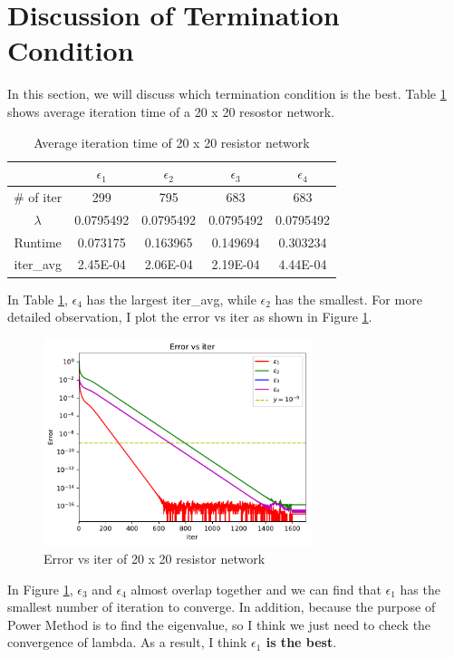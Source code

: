 \documentclass{article}
\begin{document}
\section{Discussion of Termination Condition}
\label{sec:part1}
In this section, we will discuss which termination condition is the best. Table \ref{tab:termination condition} shows average iteration
time of a 20 x 20 resostor network.
\begin{table}[H]
    \begin{center}
        \begin{tabular}{|c|c|c|c|c|}
            \hline
                & $\epsilon_1$ & $\epsilon_2$ & $\epsilon_3$ & $\epsilon_4$ \\ \hline
            \# of iter & 299 & 795 & 683 & 683 \\ \hline
            $\lambda$ & 0.0795492 & 0.0795492 & 0.0795492 & 0.0795492 \\ \hline
            Runtime & 0.073175 & 0.163965 & 0.149694 & 0.303234 \\ \hline
            iter\_avg & 2.45E-04 & 2.06E-04 & 2.19E-04 & 4.44E-04 \\ \hline
        \end{tabular}
    \end{center}
    \caption{Average iteration time of 20 x 20 resistor network}
    \label{tab:termination condition}
\end{table}
In Table \ref{tab:termination condition}, $\epsilon_4$ has the largest iter\_avg, while $\epsilon_2$ has the smallest. For more detailed
observation, I plot the error vs iter as shown in Figure \ref{fig:termination condition}.
\begin{figure}[H]
    \centering
    \includegraphics[width=0.7\textwidth]{src/error_1234.pdf}
    \caption{Error vs iter of 20 x 20 resistor network}
    \label{fig:termination condition}
\end{figure}
In Figure \ref{fig:termination condition}, $\epsilon_3$ and $\epsilon_4$ almost overlap together and we can find that $\epsilon_1$ has the smallest 
number of iteration to converge. In addition, because the purpose of Power Method is to find the eigenvalue, so I think we just need to check 
the convergence of lambda. As a result, I think \textbf{{\boldmath$\epsilon_1$} is the best}.
\end{document}

